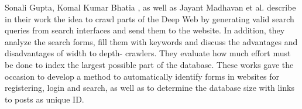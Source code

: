 Sonali Gupta, Komal Kumar Bhatia \cite{gupta2014comparative}, as well as Jayant Madhavan et al.\@\cite{madhavan2008google} describe in their work the idea to crawl parts of the Deep Web by generating valid search queries from search interfaces and send them to the website. In addition, they analyze the search forms, fill them with keywords and discuss the advantages and disadvantages of width to depth- crawlers. They evaluate how much effort must be done to index the largest possible part of the database. These works gave the occasion to develop a method to automatically identify forms in websites for registering, login and search, as well as to determine the database size with links to posts as unique ID.

\newpage